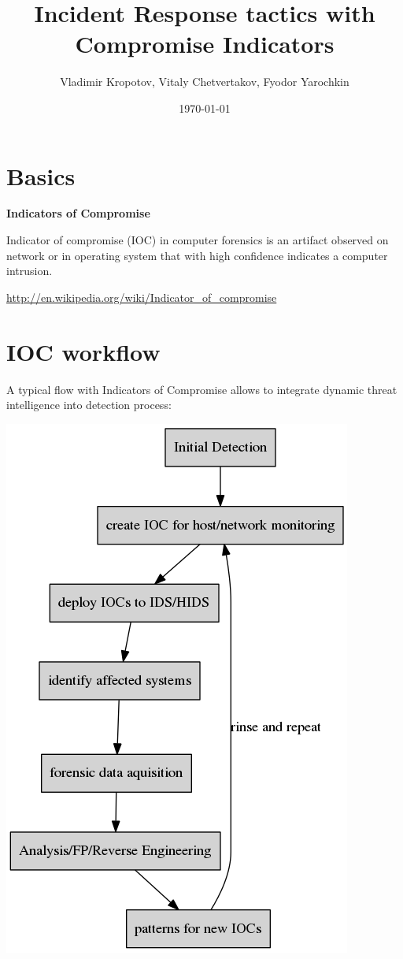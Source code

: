 \documentclass[11pt]{article}
\author{Vladimir Kropotov, Vitaly Chetvertakov, Fyodor Yarochkin}
\date{\today}
\title{Incident Response tactics with Compromise Indicators}
\begin{document}
\maketitle
\tableofcontents


\section*{Basics}
\label{sec-1}

\textbf{Indicators of Compromise}

Indicator of compromise (IOC) in computer forensics is an artifact
observed on network or in operating system that with high confidence
indicates a computer intrusion.

\url{http://en.wikipedia.org/wiki/Indicator_of_compromise}


\section*{IOC workflow}
\label{sec-2}


A typical flow with Indicators of Compromise allows
to integrate dynamic threat intelligence into detection 
process:

\includegraphics[width=.9\linewidth]{images/ioc.png}
\end{document}

